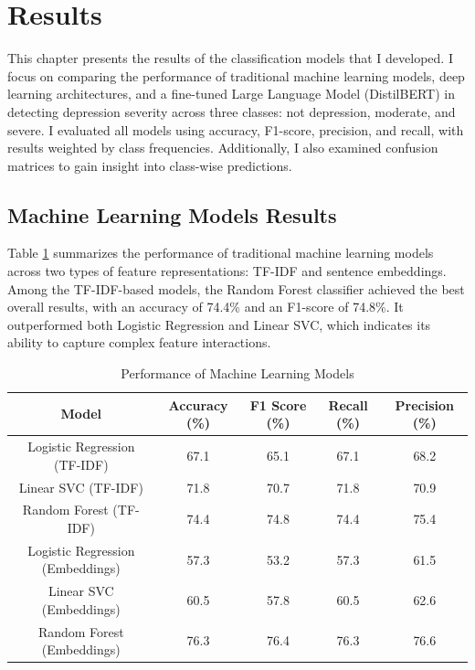 \section{Results}

This chapter presents the results of the classification models that I developed. I focus on comparing the performance of traditional machine learning models, deep learning architectures, and a fine-tuned Large Language Model (DistilBERT) in detecting depression severity across three classes: not depression, moderate, and severe. I evaluated all models using accuracy, F1-score, precision, and recall, with results weighted by class frequencies. Additionally, I also examined confusion matrices to gain insight into class-wise predictions.

\subsection{Machine Learning Models Results}

Table \ref{Table_2} summarizes the performance of traditional machine learning models across two types of feature representations: TF-IDF and sentence embeddings. Among the TF-IDF-based models, the Random Forest classifier achieved the best overall results, with an accuracy of 74.4\% and an F1-score of 74.8\%. It outperformed both Logistic Regression and Linear SVC, which indicates its ability to capture complex feature interactions.

\begin{table}
    \centering
    \caption{Performance of Machine Learning Models}
    \label{Table_2}
    \begin{tabular}{ccccc}
        \toprule
            \textbf{Model}          & 
            \textbf{Accuracy (\%)}  & 
            \textbf{F1 Score (\%)}  & 
            \textbf{Recall (\%)}    & 
            \textbf{Precision (\%)} \\
        \midrule
            Logistic Regression (TF-IDF)      & 67.1 & 65.1 & 67.1 & 68.2 \\
            Linear SVC (TF-IDF)               & 71.8 & 70.7 & 71.8 & 70.9 \\
            Random Forest (TF-IDF)            & 74.4 & 74.8 & 74.4 & 75.4 \\
        \midrule
            Logistic Regression (Embeddings)  & 57.3 & 53.2 & 57.3 & 61.5 \\
            Linear SVC (Embeddings)           & 60.5 & 57.8 & 60.5 & 62.6 \\
            Random Forest (Embeddings)        & 76.3 & 76.4 & 76.3 & 76.6 \\
        \bottomrule
    \end{tabular}
\end{table}

